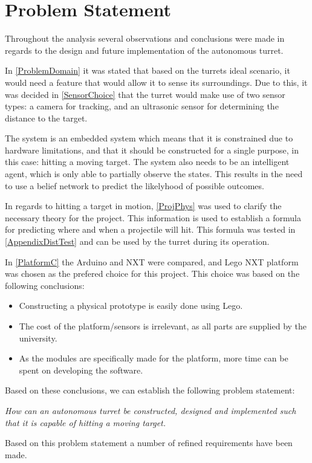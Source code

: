 \chapter{Problem Statement}

Throughout the analysis several observations and conclusions were made in
regards to the design and future implementation of the autonomous turret. 

In \autoref{ProblemDomain} it was stated that based on the turrets ideal
scenario, it would need a feature that would allow it to sense its
surroundings. Due to this, it was decided in \autoref{SensorChoice} that the
turret would make use of two sensor types: a camera for tracking, and an
ultrasonic sensor for determining the distance to the target.\nl

The system is an embedded system which means that it is constrained due to
hardware limitations, and that it should be constructed for a single purpose,
in this case: hitting a moving target. The system also needs to be an
intelligent agent, which is only able to partially observe the states. This
results in the need to use a belief network to predict the likelyhood of
possible outcomes.

In regards to hitting a target in motion, \autoref{ProjPhys} was used to
clarify the necessary theory for the project. This information is used to
establish a formula for predicting where and when a projectile will hit. This
formula was tested in \autoref{AppendixDistTest} and can be used by the turret
during its operation.\nl

In \autoref{PlatformC} the Arduino and NXT were compared, and Lego NXT
platform was chosen as the prefered choice for this project. This choice was
based on the following conclusions:
\begin{itemize}
  \item Constructing a physical prototype is easily done using Lego.
  \item The cost of the platform/sensors is irrelevant, as all parts are
  supplied by the university.
  \item As the modules are specifically made for the platform, more time can be
  spent on developing the software.
\end{itemize}

Based on these conclusions, we can establish the following
problem statement:

\begin{center}
\begin{minipage}{0.8\linewidth}
\textit{How can an autonomous turret be constructed, designed and implemented
such that it is capable of hitting a moving target.}
\end{minipage}
\end{center}

Based on this problem statement a number of refined requirements have been made.
